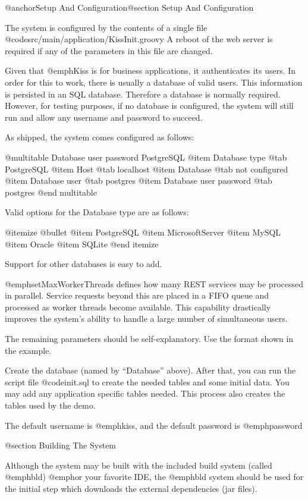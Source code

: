 @anchor{Setup And Configuration}@section Setup And Configuration

The system is configured by the contents of a single file
@code{src/main/application/KissInit.groovy} A reboot of the web server
is required if any of the parameters in this file are changed.

Given that @emph{Kiss} is for business applications, it authenticates its
users.  In order for this to work, there is usually a database of valid
users.  This information is persisted in an SQL database.  Therefore a
database is normally required.  However, for testing purposes, if no
database is configured, the system will still run and allow any
username and password to succeed.

As shipped, the system comes configured as follows:

@multitable {Database user password} {PostgreSQL} 
@item Database type
@tab PostgreSQL
@item Host
@tab localhost
@item Database
@tab not configured
@item Database user
@tab postgres
@item Database user password
@tab postgres
@end multitable

Valid options for the Database type are as follows:

@itemize @bullet
@item
PostgreSQL
@item
MicrosoftServer
@item
MySQL
@item
Oracle
@item
SQLite
@end itemize

Support for other databases is easy to add.

@emph{setMaxWorkerThreads} defines how many REST services may be
processed in parallel.  Service requests beyond this are placed in a
FIFO queue and processed as worker threads become available.  This
capability drastically improves the system's ability to handle a large
number of simultaneous users.

The remaining parameters should be self-explanatory.  Use the format
shown in the example.

Create the database (named by ``Database'' above).  After that, you
can run the script file @code{init.sql} to create the needed tables and
some initial data.  You may add any application specific tables
needed.  This process also creates the tables used by the demo.

The default username is @emph{kiss}, and the default password is
@emph{password}

@section Building The System

Although the system may be built with the included build system
(called @emph{bld}) @emph{or} your favorite IDE, the @emph{bld}
system should be used for the initial step which downloads the external
dependencies (jar files).

